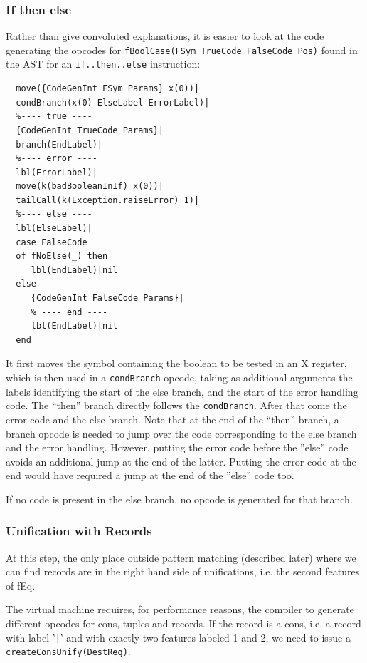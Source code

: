 \documentclass[a4paper]{memoir}
\begin{document}
\subsubsection{If then else}
Rather than give convoluted explanations, it is easier to look at the code generating the opcodes for \lstinline!fBoolCase(FSym TrueCode FalseCode Pos)! found in the AST for an \lstinline!if..then..else! instruction:
\begin{lstlisting}
  move({CodeGenInt FSym Params} x(0))|
  condBranch(x(0) ElseLabel ErrorLabel)|
  %---- true ----
  {CodeGenInt TrueCode Params}|
  branch(EndLabel)|
  %---- error ----
  lbl(ErrorLabel)|
  move(k(badBooleanInIf) x(0))|
  tailCall(k(Exception.raiseError) 1)|
  %---- else ----
  lbl(ElseLabel)|
  case FalseCode
  of fNoElse(_) then
     lbl(EndLabel)|nil
  else
     {CodeGenInt FalseCode Params}|
     % ---- end ----
     lbl(EndLabel)|nil
  end
\end{lstlisting}
It first moves the symbol containing the boolean to be tested in an X register,
which is then used in a \lstinline!condBranch! opcode, taking as additional
arguments the labels identifying the start of the else branch, and the start of
the error handling code. The ``then'' branch directly follows the
\lstinline!condBranch!. After that come the error code and the else branch. Note
that at the end of the ``then'' branch, a branch opcode is needed to jump over
the code corresponding to the else branch and the error handling. However,
putting the error code before the ''else'' code avoids an additional jump at the
end of the latter. Putting the error code at the end would have required a jump
at the end of the ''else'' code too.

If no code is present in the else branch, no opcode is generated for that branch.

\subsubsection{Unification with Records}
At this step, the only place outside pattern matching (described later) where we can find records are in the right hand side of unifications, i.e. the second features of fEq. 

The virtual machine requires, for performance reasons, the compiler to generate different opcodes for cons, tuples and records.
If the record is a cons, i.e. a record with label '\lstinline!|!' and with
exactly two features labeled 1 and 2, we need to issue a \lstinline!createConsUnify(DestReg)!. 
\end{document}
